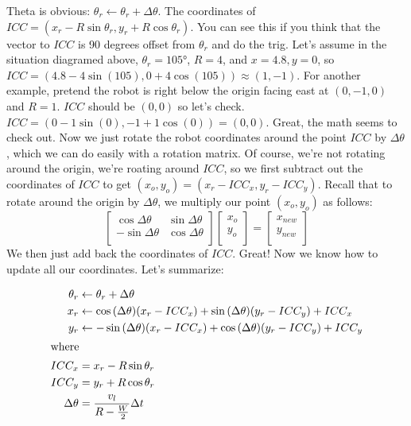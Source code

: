\documentclass{article}
\begin{document}
Theta is obvious: $\theta_r \leftarrow \theta_r+\Delta\theta$. The coordinates of $ICC = (x_r-R\sin{\theta_r}, y_r+R\cos{\theta_r})$. You can see this if you think that the vector to $ICC$ is 90 degrees offset from $\theta_r$ and do the trig. Let's assume in the situation diagramed above, $\theta_r=\ang{105}$, $R=4$, and $x=4.8, y=0$, so $ICC = (4.8-4\sin{(105)}, 0+4\cos{(105)}) \approx (1, -1)$. For another example, pretend the robot is right below the origin facing east at $(0,-1,0)$ and $R=1$. $ICC$ should be $(0,0)$ so let's check. $ICC = (0-1\sin{(0)}, -1+1\cos{(0)}) = (0, 0).$ Great, the math seems to check out. Now we just rotate the robot coordinates around the point $ICC$ by $\Delta\theta$, which we can do easily with a rotation matrix. Of course, we're not rotating around the origin, we're roating around $ICC$, so we first subtract out the coordinates of $ICC$ to get $(x_o, y_o) = (x_r- ICC_x, y_r-ICC_y)$. Recall that to rotate around the origin by $\Delta\theta$, we multiply our point $(x_o, y_o)$ as follows:
\begin{equation}
  \begin{bmatrix}
    \cos{\Delta\theta} & \sin{\Delta\theta} \\
    -\sin{\Delta\theta} & \cos{\Delta\theta} \\
  \end{bmatrix}
  \begin{bmatrix}
    x_o \\
    y_o \\
  \end{bmatrix}
  =
  \begin{bmatrix}
    x_{new} \\
    y_{new} \\
  \end{bmatrix}
\end{equation}
We then just add back the coordinates of $ICC$. Great! Now we know how to update all our coordinates. Let's summarize:

\begin{align}
 \theta_r &\leftarrow \theta_r + \Delta\theta \\
  x_r &\leftarrow \cos{(\Delta\theta)}(x_r-ICC_x)+\sin{(\Delta\theta)}(y_r-ICC_y) + ICC_x \\
  y_r &\leftarrow -\sin{(\Delta\theta)}(x_r-ICC_x)+\cos{(\Delta\theta)}(y_r-ICC_y) + ICC_y \\
\shortintertext{where}
  ICC_x &= x_r-R\sin{\theta_r} \\
  ICC_y &= y_r+R\cos{\theta_r} \\
  \Delta\theta &= \dfrac{v_l}{R-\frac{W}{2}}\Delta t
\end{align}
\end{document}
